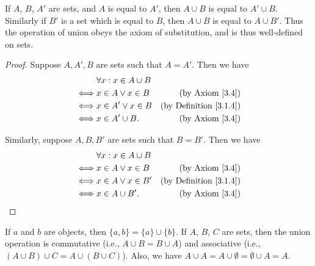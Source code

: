 \setcounter{theorem}{11}
\begin{remark}\label{3.1.12}
    If \(A\), \(B\), \(A'\) are sets, and \(A\) is equal to \(A'\), then \(A \cup B\) is equal to \(A' \cup B\).
    Similarly if \(B'\) is a set which is equal to \(B\), then \(A \cup B\) is equal to \(A \cup B'\).
    Thus the operation of union obeys the axiom of substitution, and is thus well-defined on sets.
\end{remark}

\begin{proof}
    Suppose \(A, A', B\) are sets such that \(A = A'\).
    Then we have
    \begin{align*}
             & \forall x : x \in A \cup B                                      \\
        \iff & x \in A \lor x \in B       & \text{(by Axiom \ref{3.4})}        \\
        \iff & x \in A' \lor x \in B      & \text{(by Definition \ref{3.1.4})} \\
        \iff & x \in A' \cup B.           & \text{(by Axiom \ref{3.4})}
    \end{align*}

    Similarly, suppose \(A, B, B'\) are sets such that \(B = B'\).
    Then we have
    \begin{align*}
             & \forall x : x \in A \cup B                                      \\
        \iff & x \in A \lor x \in B       & \text{(by Axiom \ref{3.4})}        \\
        \iff & x \in A \lor x \in B'      & \text{(by Definition \ref{3.1.4})} \\
        \iff & x \in A \cup B'.           & \text{(by Axiom \ref{3.4})}
    \end{align*}
\end{proof}

\begin{lemma}\label{3.1.13}
    If \(a\) and \(b\) are objects, then \(\{a, b\} = \{a\} \cup \{b\}\).
    If \(A\), \(B\), \(C\) are sets, then the union operation is commutative (i.e., \(A \cup B = B \cup A\)) and associative (i.e., \((A \cup B) \cup C = A \cup (B \cup C)\)).
    Also, we have \(A \cup A = A \cup \emptyset = \emptyset \cup A = A\).
\end{lemma}

